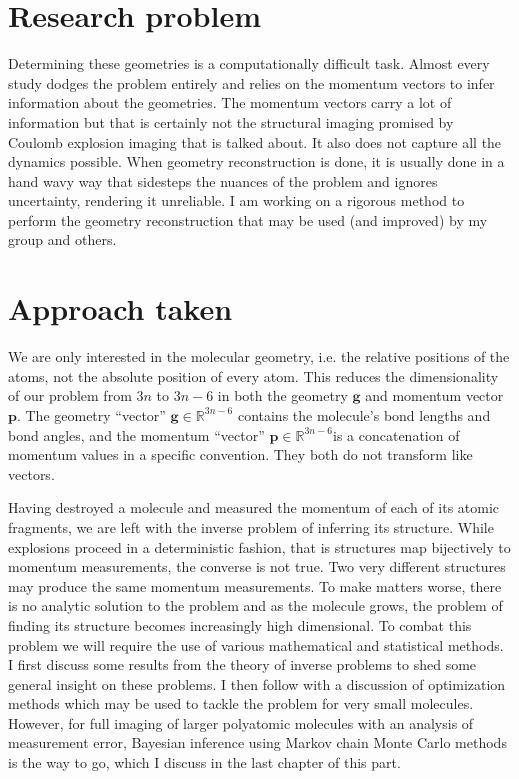 \section{Research problem}
Determining these geometries is a computationally difficult task. Almost every study dodges the problem entirely and relies on the momentum vectors to infer information about the geometries. The momentum vectors carry a lot of information but that is certainly not the structural imaging promised by Coulomb explosion imaging that is talked about. It also does not capture all the dynamics possible. When geometry reconstruction is done, it is usually done in a hand wavy way that sidesteps the nuances of the problem and ignores uncertainty, rendering it unreliable. I am working on a rigorous method to perform the geometry reconstruction that may be used (and improved) by my group and others.

\section{Approach taken}
We are only interested in the molecular geometry, i.e. the relative positions of the atoms, not the absolute position of every atom. This reduces the dimensionality of our problem from $3n$ to $3n-6$ in both the geometry $\mathbf{g}$ and momentum vector $\mathbf{p}$. The geometry ``vector'' $\mathbf{g} \in \mathbb{R}^{3n-6}$ contains the molecule's bond lengths and bond angles, and the momentum ``vector'' $\mathbf{p} \in \mathbb{R}^{3n-6}$is a concatenation of momentum values in a specific convention. They both do not transform like vectors.

Having destroyed a molecule and measured the momentum of each of its atomic fragments, we are left with the inverse problem of inferring its structure. While explosions proceed in a deterministic fashion, that is structures map bijectively to momentum measurements, the converse is not true. Two very different structures may produce the same momentum measurements. To make matters worse, there is no analytic solution to the problem and as the molecule grows, the problem of finding its structure becomes increasingly high dimensional. To combat this problem we will require the use of various mathematical and statistical methods. I first discuss some results from the theory of inverse problems to shed some general insight on these problems. I then follow with a discussion of optimization methods which may be used to tackle the problem for very small molecules. However, for full imaging of larger polyatomic molecules with an analysis of measurement error, Bayesian inference using Markov chain Monte Carlo methods is the way to go, which I discuss in the last chapter of this part.

